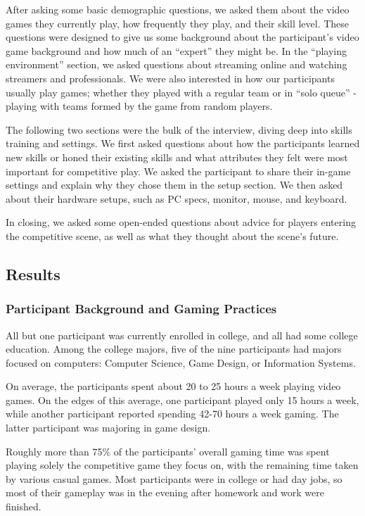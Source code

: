 \documentclass[11pt,manuscript,screen,review]{acmart} %
\begin{document}
After asking some basic demographic questions, we asked them about the video games they currently play, how frequently they play, and their skill level. These questions were designed to give us some background about the participant’s video game background and how much of an “expert” they might be. In the “playing environment” section, we asked questions about streaming online and watching streamers and professionals. We were also interested in how our participants usually play games; whether they played with a regular team or in “solo queue” - playing with teams formed by the game from random players.  

The following two sections were the bulk of the interview, diving deep into skills training and settings. We first asked questions about how the participants learned new skills or honed their existing skills and what attributes they felt were most important for competitive play. We asked the participant to share their in-game settings and explain why they chose them in the setup section. We then asked about their hardware setups, such as PC specs, monitor, mouse, and keyboard. 

In closing, we asked some open-ended questions about advice for players entering the competitive scene, as well as what they thought about the scene’s future. 

\subsection{Results}
\subsubsection{Participant Background and Gaming Practices}

All but one participant was currently enrolled in college, and all had some college education. Among the college majors, five of the nine participants had majors focused on computers: Computer Science, Game Design, or Information Systems.

On average, the participants spent about 20 to 25 hours a week playing video games. On the edges of this average, one participant played only 15 hours a week, while another participant reported spending 42-70 hours a week gaming. The latter participant was majoring in game design. 

Roughly more than 75\% of the participants’ overall gaming time was spent playing solely the competitive game they focus on, with the remaining time taken by various casual games. Most participants were in college or had day jobs, so most of their gameplay was in the evening after homework and work were finished. 
\end{document}
